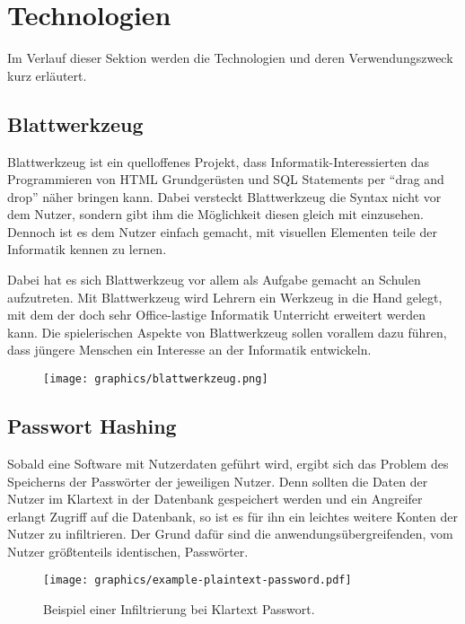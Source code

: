 \section{Technologien}
\label{sec:technology}
Im Verlauf dieser Sektion werden die Technologien und deren Verwendungszweck
kurz erläutert.

\subsection{Blattwerkzeug}
\label{sec:blattwerkzeug}
Blattwerkzeug ist ein quelloffenes Projekt, dass Informatik-Interessierten das Programmieren von \gls{HTML} Grundgerüsten und SQL Statements per \enquote{drag and drop} näher bringen kann. Dabei versteckt Blattwerkzeug die Syntax nicht vor dem Nutzer, sondern gibt ihm die Möglichkeit diesen gleich mit einzusehen. Dennoch ist es dem Nutzer einfach gemacht, mit visuellen Elementen teile der Informatik kennen zu lernen.

Dabei hat es sich Blattwerkzeug vor allem als Aufgabe gemacht an Schulen aufzutreten. Mit Blattwerkzeug wird Lehrern ein Werkzeug in die Hand gelegt, mit dem der doch sehr Office-lastige Informatik Unterricht erweitert werden kann. Die spielerischen Aspekte von Blattwerkzeug sollen vorallem dazu führen, dass jüngere Menschen ein Interesse an der Informatik entwickeln.

\begin{figure}[h]
	\texttt{[image: graphics/blattwerkzeug.png]}
\end{figure}

\subsection{Passwort Hashing}
\label{sec:password_hashing}

Sobald eine Software mit Nutzerdaten geführt wird, ergibt sich das Problem des Speicherns der Passwörter der jeweiligen Nutzer.
Denn sollten die Daten der Nutzer im Klartext in der Datenbank gespeichert werden und ein Angreifer erlangt Zugriff auf die Datenbank, so ist es für ihn ein leichtes weitere Konten der Nutzer zu infiltrieren. Der Grund dafür sind die anwendungsübergreifenden, vom Nutzer grö{\ss}tenteils identischen, Passwörter.

\begin{figure}[h]
	\centering
	\texttt{[image: graphics/example-plaintext-password.pdf]}
	\caption{Beispiel einer Infiltrierung bei Klartext Passwort.}
\end{figure}

